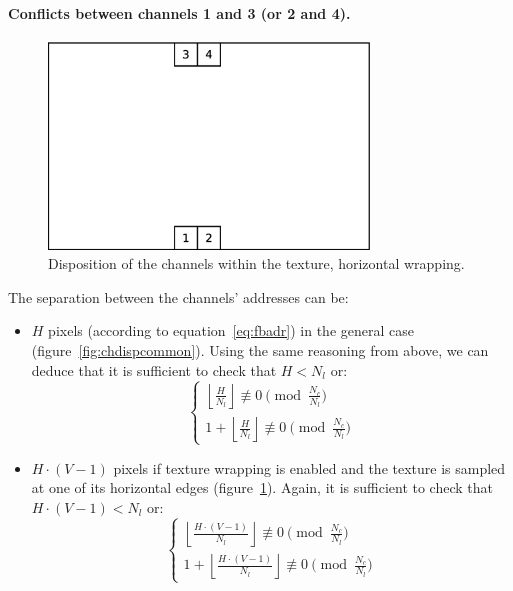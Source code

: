 \documentclass[a4paper,11pt]{kthesis}
\begin{document}
\paragraph{Conflicts between channels 1 and 3 (or 2 and 4).}
\begin{figure}[htp]
\centering
\includegraphics[height=55mm]{chdisp_hwrap.eps}
\caption{Disposition of the channels within the texture, horizontal wrapping.}\label{fig:chdisphwrap}
\end{figure}
The separation between the channels' addresses can be:
\begin{itemize}
\item $H$ pixels (according to equation~\ref{eq:fbadr}) in the general case (figure~\ref{fig:chdispcommon}). Using the same reasoning from above, we can deduce that it is sufficient to check that $H < N_{l}$ or:
\begin{equation}
\begin{cases}
\left\lfloor \frac{H}{N_{l}} \right\rfloor \not \equiv 0 \pmod{\frac{N_{c}}{N_{l}}} \\
1 + \left\lfloor \frac{H}{N_{l}} \right\rfloor \not \equiv 0 \pmod{\frac{N_{c}}{N_{l}}}
\end{cases}
\end{equation}
\item $H \cdot (V-1)$ pixels if texture wrapping is enabled and the texture is sampled at one of its horizontal edges (figure~\ref{fig:chdisphwrap}). Again, it is sufficient to check that $H \cdot (V-1) < N_{l}$ or:
\begin{equation}
\begin{cases}
\left\lfloor \frac{H \cdot (V-1)}{N_{l}} \right\rfloor \not \equiv 0 \pmod{\frac{N_{c}}{N_{l}}} \\
1 + \left\lfloor \frac{H \cdot (V-1)}{N_{l}} \right\rfloor \not \equiv 0 \pmod{\frac{N_{c}}{N_{l}}}
\end{cases}
\end{equation}
\end{itemize}
\end{document}
